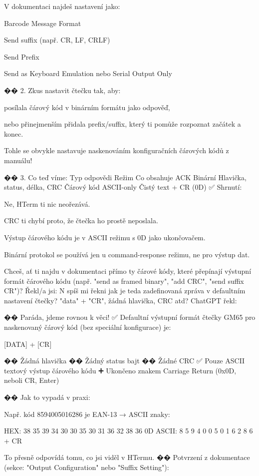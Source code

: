 V dokumentaci najdeš nastavení jako:

    Barcode Message Format

    Send suffix (např. CR, LF, CRLF)

    Send Prefix

    Send as Keyboard Emulation nebo Serial Output Only

�� 2. Zkus nastavit čtečku tak, aby:

    posílala čárový kód v binárním formátu jako odpověď,

    nebo přinejmenším přidala prefix/suffix, který ti pomůže rozpoznat začátek a konec.

    Tohle se obvykle nastavuje naskenováním konfiguračních čárových kódů z manuálu!

�� 3. Co teď víme:
Typ odpovědi	Režim	Co obsahuje
ACK	Binární	Hlavička, status, délka, CRC
Čárový kód	ASCII-only	Čistý text + CR (0D)
✅ Shrnutí:

    Ne, HTerm ti nic neořezává.

    CRC ti chybí proto, že čtečka ho prostě neposlala.

    Výstup čárového kódu je v ASCII režimu s 0D jako ukončovačem.

    Binární protokol se používá jen u command-response režimu, ne pro výstup dat.

Chceš, ať ti najdu v dokumentaci přímo ty čárové kódy, které přepínají výstupní formát čárového kódu (např. "send as framed binary", "add CRC", "send suffix CR")?
Řekl/a jsi:
N spíš mi řekni jak je teda zadefinovaná zpráva v defaultním nastavení čtečky? "data" + "CR", žádná hlavička, CRC atd?
ChatGPT řekl:

�� Paráda, jdeme rovnou k věci!
✅ Defaultní výstupní formát čtečky GM65 pro naskenovaný čárový kód (bez speciální konfigurace) je:

[DATA] + [CR]

    �� Žádná hlavička
    �� Žádný status bajt
    �� Žádné CRC
    ✅ Pouze ASCII textový výstup čárového kódu
    ➕ Ukončeno znakem Carriage Return (0x0D, neboli CR, Enter)

�� Jak to vypadá v praxi:

Např. kód 8594005016286 je EAN-13 → ASCII znaky:

HEX:    38 35 39 34 30 30 35 30 31 36 32 38 36 0D
ASCII:  8 5 9 4 0 0 5 0 1 6 2 8 6 + CR

To přesně odpovídá tomu, co jsi viděl v HTermu.
�� Potvrzení z dokumentace (sekce: "Output Configuration" nebo "Suffix Setting"):

